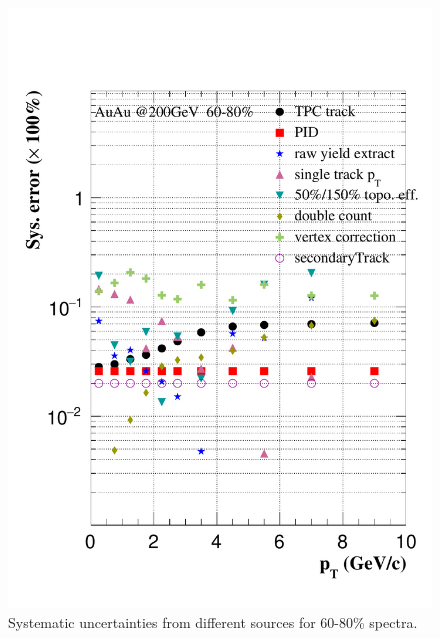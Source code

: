 \begin{figure}[htbp]
\begin{minipage}[htbp]{0.47\linewidth}
\centering
\includegraphics[width=1.0\textwidth,angle=0]{figure/Run14_D0HFT/sysErr_60_80_2.pdf}
\caption{ Systematic uncertainties from different sources for 60-80\% spectra. \label{sysErr_60_80}}
\end{minipage}
\hfill
\begin{minipage}[htbp]{0.47\linewidth}
\centering

\end{minipage}
\end{figure}
